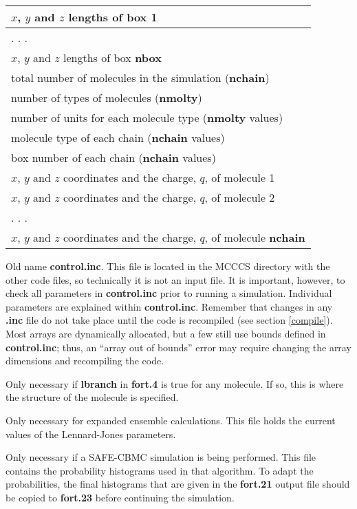 \documentclass[12pt,letterpaper]{article}
\begin{document}
{{{{{{\begin{center}
\begin{tabular}{| l |}
$x$, $y$ and $z$ lengths of box 1  \\ \hline
  . . . \\ \hline
$x$, $y$ and $z$ lengths of box {\bf nbox} \\ \hline
total number of molecules in the simulation ({\bf nchain}) \\ \hline
number of types of molecules ({\bf nmolty}) \\ \hline
number of units for each molecule type ({\bf nmolty} values) \\ \hline
molecule type of each chain ({\bf nchain} values) \\ \hline
box number of each chain ({\bf nchain} values) \\ \hline
$x$, $y$ and $z$ coordinates and the charge, $q$, of molecule 1 \\ \hline
$x$, $y$ and $z$ coordinates and the charge, $q$, of molecule 2 \\ \hline
  . . . \\ \hline
$x$, $y$ and $z$ coordinates and the charge, $q$, of molecule {\bf nchain} \\ 
  \hline
\end{tabular}
\end{center}

Old name {\bf control.inc}. This file is located in the MCCCS directory with the other code files, so technically it is not an input file.    
It is important, however, to check all parameters in {\bf control.inc} prior to running a simulation.  
Individual parameters are explained within {\bf control.inc}.
Remember that changes in any {\bf .inc} file do not take place until the code is recompiled (see section \ref{compile}).
Most arrays are dynamically allocated, but a few still use bounds defined in {\bf control.inc}; thus, an ``array out of bounds'' error may require changing the array dimensions and recompiling the code.

Only necessary if {\bf lbranch} in {\textbf{fort.4}} is true for any molecule.  If so, this is where the structure of the molecule is specified.  

Only necessary for expanded ensemble calculations. 
This file holds the current values of the Lennard-Jones parameters.

Only necessary if a SAFE-CBMC simulation is being performed. 
This file contains the probability histograms used in that algorithm.  
To adapt the probabilities, the final histograms that are given in the {\bf
fort.21} output file should be copied to {\bf fort.23} before continuing the simulation.  

}}}}}}
\end{document}
